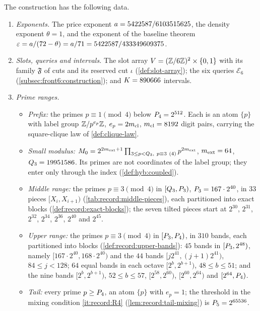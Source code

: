 \begin{definition}[Parameters]\label{def:record:parameters}
The construction has the following data.
\begin{enumerate}[label=(\alph*)]
\item \emph{Exponents.} The price exponent $a=5422587/6103515625$, the density exponent
 $\theta=1$, and the exponent of the baseline theorem
 $\varepsilon=a/(72-\theta)=a/71=5422587/433349609375$.
\item \emph{Slots, queries and intervals.} The slot array
 $V=(\mathbb Z/6\mathbb Z)^2\times\{0,1\}$ with its family $\mathfrak F$ of cuts and its
 reserved cut $\iota$ (\cref{def:slot-array}); the six queries $\mathcal E_6$
 (\cref{subsec:front6:construction}); and $K=890666$ intervals.
\item \emph{Prime ranges.}
 \begin{itemize}
 \item \emph{Prefix:} the primes $p\equiv1\pmod4$ below $P_4=2^{512}$. Each
  is an atom $\{p\}$ with label group $\mathbb Z/p^{e_p}\mathbb Z$, $e_p=2m_{\mathrm{cl}}$, $m_{\mathrm{cl}}=8192$ digit pairs, carrying the
  square-clique law of \cref{def:clique-law}.
 \item \emph{Small modulus:} $M_0=2^{2m_{\rm ext}+1}\prod_{3\le p<Q_3,\
  p\equiv3\ (4)}p^{2m_{\rm ext}}$, $m_{\rm ext}=64$, $Q_3=19951586$. Its primes are not coordinates of the
  label group; they enter only through the index (\cref{def:hyb:coupled}).
 \item \emph{Middle range:} the primes $p\equiv3\pmod4$ in $[Q_3,P_3)$,
  $P_3=167\cdot2^{40}$, in $33$ pieces $[X_i,X_{i+1})$
  (\cref{tab:record:middle-pieces}), each partitioned into exact blocks
  (\cref{def:record:exact-blocks}); the seven tilted pieces start at $2^{30}$, $2^{31}$, $2^{32}$,
  $2^{34}$, $2^{36}$, $2^{40}$ and $2^{45}$.
 \item \emph{Upper range:} the primes $p\equiv3\pmod4$ in $[P_3,P_4)$, in
  $310$ bands, each partitioned into blocks (\cref{def:record:upper-bands}):
  $45$ bands in $[P_3,2^{48})$, namely $[167\cdot2^{40},168\cdot2^{40})$
  and the $44$ bands $[j2^{41},(j+1)2^{41})$, $84\le j<128$; $64$ equal bands
  in each octave $[2^b,2^{b+1})$, $48\le b\le51$; and the nine bands
  $[2^b,2^{b+1})$, $52\le b\le57$, $[2^{58},2^{60})$, $[2^{60},2^{64})$ and
  $[2^{64},P_4)$.
 \item \emph{Tail:} every prime $p\ge P_4$, an atom $\{p\}$ with $e_p=1$; the
  threshold in the mixing condition \ref{it:record:R4}
 (\cref{lem:record:tail-mixing}) is $P_5=2^{65536}$.
 \end{itemize}

\end{enumerate}
\end{definition}

